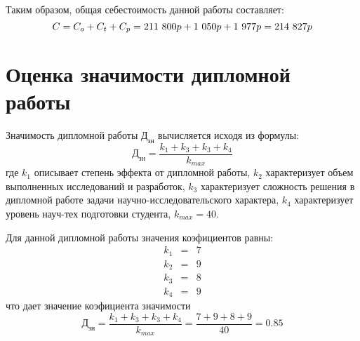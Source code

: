 Таким образом, общая себестоимость данной работы составляет:
\begin{equation}
    C = C_{o} + C_{t} + C_{p} = 211~800 p + 1~050 p + 1~977 p = 214~827 p \\
\end{equation}

\section{Оценка значимости дипломной работы}

Значимость дипломной работы $Д_{зн}$ вычисляется исходя из формулы:
\begin{equation}
  Д_{зн} = \frac{k_1 + k_3 + k_3 + k_4}{k_{max}}
\end{equation}
где $k_1$ описывает степень эффекта от дипломной работы, $k_2$ характеризует объем выполненных исследований и разработок, $k_3$ характеризует сложность решения в дипломной работе задачи научно-исследовательского характера, $k_4$ характеризует уровень науч-тех подготовки студента, $k_{max} = 40$.

Для данной дипломной работы значения коэфициентов равны:
\begin{eqnarray}
    k_1 &=& 7\nonumber \\
    k_2 &=& 9\nonumber \\
    k_3 &=& 8\nonumber \\
    k_4 &=& 9\nonumber 
\end{eqnarray}
что дает значение коэфициента значимости
\begin{equation}
  Д_{зн} = \frac{k_1 + k_3 + k_3 + k_4}{k_{max}} = \frac{7 + 9 + 8 + 9}{40} = 0.85
\end{equation}